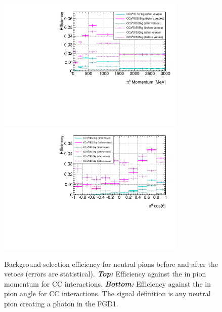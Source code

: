 \begin{figure}[ht]
  \center
  \includegraphics[width=0.8\textwidth]{images/NCg/Eff_1D_CCpPi0.pdf} \\
  \includegraphics[width=0.8\textwidth]{images/NCg/Eff_1D_CCctPi0.pdf}
  \caption[Background selection efficiency for neutral pions before
  and after the vetoes]{Background selection efficiency for neutral
    pions before and after the vetoes (errors are
    statistical). \textbf{\textit{Top:}} Efficiency against the in
    pion momentum for \Gls{CC} interactions.
    \textbf{\textit{Bottom:}} Efficiency against the in pion angle for
    \Gls{CC} interactions. The signal definition is any neutral pion
    creating a photon in the \Gls{FGD}1.}
  \label{fig:pizeff2}
\end{figure}



